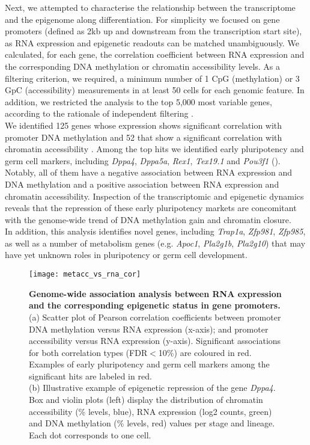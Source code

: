 Next, we attempted to characterise the relationship between the transcriptome and the epigenome along differentiation. For simplicity we focused on gene promoters (defined as 2kb up and downstream from the transcription start site), as RNA expression and epigenetic readouts can be matched unambiguously. We calculated, for each gene, the correlation coefficient between RNA expression and the corresponding DNA methylation or chromatin accessibility levels. As a filtering criterion, we required, a minimum number of 1 CpG
(methylation) or 3 GpC (accessibility) measurements in at least 50 cells for each genomic feature. In addition, we restricted the analysis to the top 5,000 most variable genes, according to the rationale of independent filtering \cite{Bourgon2010}.\\
We identified 125 genes whose expression shows significant correlation with promoter DNA methylation and 52 that show a significant correlation with chromatin accessibility .
Among the top hits we identified early pluripotency and germ cell markers, including \textit{Dppa4}, \textit{Dppa5a}, \textit{Rex1}, \textit{Tex19.1} and \textit{Pou3f1} (). Notably, all of them have a negative association between RNA expression and DNA methylation and a positive association between RNA expression and chromatin accessibility. Inspection of the transcriptomic and epigenetic dynamics reveals that the repression of these early pluripotency markets are concomitant with the genome-wide trend of DNA methylation gain and chromatin closure.\\
In addition, this analysis identifies novel genes, including \textit{Trap1a}, \textit{Zfp981}, \textit{Zfp985}, as well as a number of metabolism genes (e.g. \textit{Apoc1}, \textit{Pla2g1b}, \textit{Pla2g10}) that may have yet unknown roles in pluripotency or germ cell development.

\begin{figure}[H]
	\centering
	\texttt{[image: metacc\_vs\_rna\_cor]}
	\caption[]{\textbf{Genome-wide association analysis between RNA expression and the corresponding epigenetic status in gene promoters.}\\
	(a) Scatter plot of Pearson correlation coefficients between promoter DNA methylation versus RNA expression (x-axis); and promoter accessibility versus RNA expression (y-axis). Significant associations for both correlation types (FDR$<$10\%) are coloured in red. Examples of early pluripotency and germ cell markers among the significant hits are labeled in red.\\
	(b) Illustrative example of epigenetic repression of the gene \textit{Dppa4}. Box and violin plots (left) display the distribution of chromatin accessibility (\% levels, blue), RNA expression (log2 counts, green) and DNA methylation (\% levels, red) values per stage and lineage. Each dot corresponds to one cell.
	}
	\label{fig:metacc_vs_rna_cor}
\end{figure}


